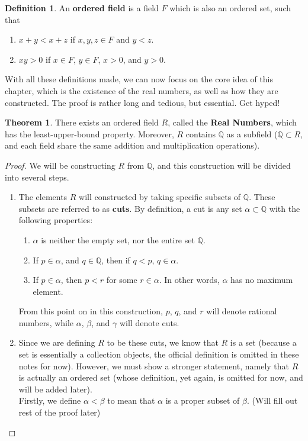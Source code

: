 \documentclass{article}
\theoremstyle{definition}
\newtheorem{definition}{Definition}[section]
\newtheorem{theorem}{Theorem}[section]
\begin{document}
\begin{section}
\begin{definition}
An \textbf{ordered field} is a field $F$ which is also an ordered set, such that 
\begin{enumerate}
\item[(i)] $x + y < x + z$ if $x,y,z \in F$ and $y < z$.
\item[(ii)] $xy > 0$ if $x \in F$, $y \in F$, $x > 0$, and $y > 0$.
\end{enumerate}
\end{definition}
\noindent With all these definitions made, we can now focus on the core idea of this chapter, which is the existence of the real numbers, as well as how they are constructed. The proof is rather long and tedious, but essential. Get hyped!
\begin{theorem}
There exists an ordered field $R$, called the \textbf{Real Numbers}, which has the least-upper-bound property. Moreover, $R$ contains $\mathbb{Q}$ as a subfield ($\mathbb{Q} \subset R$, and each field share the same addition and multiplication operations).
\end{theorem}

\begin{proof}
We will be constructing $R$ from $\mathbb{Q}$, and this construction will be divided into several steps.
\begin{enumerate}
\item[Step 1:] The elements $R$ will constructed by taking specific subsets of $\mathbb{Q}$. These subsets are referred to as \textbf{cuts}. By definition, a cut is any set $\alpha \subset \mathbb{Q}$ with the following properties:
\begin{enumerate}
\item[(i)] $\alpha$ is neither the empty set, nor the entire set $\mathbb{Q}$.
\item[(ii)] If $ p \in \alpha$, and $q \in \mathbb{Q}$, then if $q < p$, $q \in \alpha$.
\item[(iii)] If $p \in \alpha$, then $p < r$ for some $r \in \alpha$. In other words, $\alpha$ has no maximum element.
\end{enumerate}
From this point on in this construction, $p$, $q$, and $r$ will denote rational numbers, while $\alpha$, $\beta$, and $\gamma$ will denote cuts.

\item[Step 2:] Since we are defining $R$ to be these cuts, we know that $R$ is a set (because a set is essentially a collection objects, the official definition is omitted in these notes for now). However, we must show a stronger statement, namely that $R$ is actually an ordered set (whose definition, yet again, is omitted for now, and will be added later). \\
Firstly, we define $\alpha < \beta$ to mean that $\alpha$ is a proper subset of $\beta$. (Will fill out rest of the proof later)


\end{enumerate}
\end{proof}
\end{section}
\end{document}
